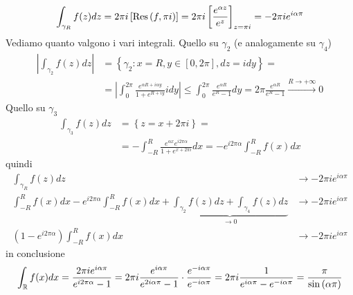 \begin{figure}[htpb]
\end{figure}
\FloatBarrier

\begin{equation*}
\int_{\gamma_{R}} f(z) dz = 2\pi i\left[\operatorname{Res} \left(f, \pi i\right)\right] = 2\pi i\left[\frac{e^{\alpha z}}{e^{z}}\right]_{z = \pi i} = - 2\pi ie^{i\alpha \pi}
\end{equation*}
Vediamo quanto valgono i vari integrali. Quello su $\gamma_{2}$ (e analogamente su $\gamma_{4}$)
\begin{align*}
\left| \int_{\gamma_{2}} f(z) dz\right|  & = \left\{\gamma_{2} :x = R, y\in \left[ 0, 2\pi \right], dz = idy\right\} = \\
 & = \left| \int^{2\pi}_{0}\frac{e^{\alpha R + i\alpha y}}{1 + e^{R + iy}} idy\right| \leq \int^{2\pi}_{0}\frac{e^{\alpha R}}{e^{R} - 1} dy = 2\pi \frac{e^{\alpha R}}{e^{R} - 1}\xrightarrow{R\rightarrow + \infty} 0
\end{align*}
Quello su $\gamma_{3}$
\begin{align*}
\int_{\gamma_{3}} f(z) dz & = \left\{z = x + 2\pi i\right\} = \\
 & = - \int^{R}_{- R}\frac{e^{\alpha x} e^{i2\pi \alpha}}{1 + e^{x + 2\pi i}} dx = -e^{i2\pi \alpha}\int^{R}_{- R} f(x) dx
\end{align*}
quindi
\begin{align*}
\int_{\gamma_{R}} f(z) dz & \rightarrow - 2\pi ie^{i\alpha \pi}\\
\int^{R}_{- R} f(x) dx - e^{i2\pi \alpha}\int^{R}_{- R} f(x) dx + \underbrace{\int_{\gamma_{2}} f(z) dz + \int_{\gamma_{4}} f(z) dz}_{\rightarrow 0} & \rightarrow - 2\pi ie^{i\alpha \pi}\\
\left(1 - e^{i2\pi \alpha}\right)\int^{R}_{- R} f(x) dx & \rightarrow - 2\pi ie^{i\alpha \pi}
\end{align*}
in conclusione
\begin{equation*}
\int_{\mathbb{R}} f(x) dx = \frac{2\pi ie^{i\alpha \pi}}{e^{i2\pi \alpha} - 1} = 2\pi i\frac{e^{i\alpha \pi}}{e^{2i\alpha \pi} - 1} \cdot \frac{e^{- i\alpha \pi}}{e^{- i\alpha \pi}} = 2\pi i\frac{1}{e^{i\alpha \pi} - e^{- i\alpha \pi}} = \frac{\pi}{\sin\left(\alpha \pi \right)}
\end{equation*}
